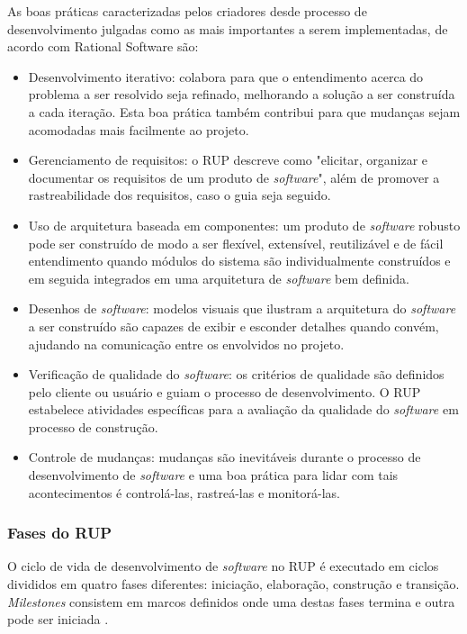 As boas práticas caracterizadas pelos criadores desde processo de desenvolvimento julgadas como as mais importantes a serem implementadas, de acordo com Rational Software \cite{rational_software_rational_1998} são:

\begin{itemize}
\item Desenvolvimento iterativo: colabora para que o entendimento acerca do problema a ser resolvido seja refinado, melhorando a solução a ser construída a cada iteração. Esta boa prática também contribui para que mudanças sejam acomodadas mais facilmente ao projeto.

\item Gerenciamento de requisitos: o RUP descreve como "elicitar, organizar e documentar os requisitos de um produto de \textit{software}", além de promover a rastreabilidade dos requisitos, caso o guia seja seguido.

\item Uso de arquitetura baseada em componentes: um produto de \textit{software} robusto pode ser construído de modo a ser flexível, extensível, reutilizável e de fácil entendimento quando módulos do sistema são individualmente construídos e em seguida integrados em uma arquitetura de \textit{software} bem definida.

\item Desenhos de \textit{software}: modelos visuais que ilustram a arquitetura  do \textit{software} a ser construído são capazes de exibir e esconder detalhes quando convém, ajudando na comunicação entre os envolvidos no projeto.

\item Verificação de qualidade do \textit{software}: os critérios de qualidade são definidos pelo cliente ou usuário e guiam o processo de desenvolvimento. O RUP estabelece atividades específicas para a avaliação da qualidade do \textit{software} em processo de construção.

\item Controle de mudanças: mudanças são inevitáveis durante o processo de desenvolvimento de \textit{software} e uma boa prática para lidar com tais acontecimentos é controlá-las, rastreá-las e monitorá-las. 
\end{itemize}

\subsubsection{Fases do RUP}
O ciclo de vida de desenvolvimento de \textit{software} no RUP é executado em ciclos divididos em quatro fases diferentes: iniciação, elaboração, construção e transição. \textit{Milestones} consistem em marcos definidos onde uma destas fases termina e outra pode ser iniciada \cite{rational_software_rational_1998}. 

